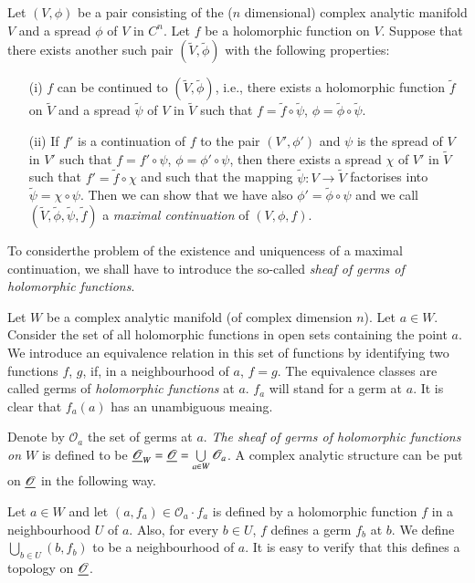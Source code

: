 \medskip
{}

Let $(V,\phi)$ be a pair consisting of the ($n$ dimensional) complex
analytic manifold $V$ and a spread $\phi$ of $V$ in $C^n$. Let $f$ be
a holomorphic function on $V$. Suppose that there exists another such
pair $(\tilde{V}, \tilde{\phi})$ with the following properties:
\begin{itemize}
\item[(i)] $f$ can be continued to $(\tilde{V}, \tilde{\phi})$, i.e.,
  there exists a holomorphic function $\tilde{f}$ on $\tilde{V}$ and a
  spread $\tilde{\psi}$ of $V$ in $\tilde{V}$ such that $f = \tilde{f}
  \circ \tilde{\psi}$, $\phi = \tilde{\phi} \circ \tilde{\psi}$.

\item[(ii)] If $f'$ is a continuation of $f$ to the pair $(V', \phi')$ and
  $\psi$ is the spread of $V$ in  $V'$ such that $f = f' \circ \psi$,
  $\phi = \phi' \circ \psi$, then there exists a spread $\chi$ of $V'$
  in $\tilde{V}$ such that $f' = \tilde{f} \circ \chi$ and such that
  the mapping $\tilde{\psi} : V \to \tilde{V}$ factorises into
  $\tilde{\psi} = \chi \circ \psi$. Then we can show that we have also
  $\phi' = \tilde{\phi} \circ \psi$ and we call $(\tilde{V},
  \tilde{\phi}, \tilde{\psi}, \tilde{f})$ a \textit{maximal
    continuation} of $(V, \phi, f)$.
\end{itemize}

To consider\pageoriginale the problem of the existence and uniquencess
of a maximal continuation, we shall have to introduce the so-called
\textit{sheaf of germs of holomorphic functions}.


Let $W$ be a complex analytic manifold (of complex dimension $n$). Let
$a \in W$. Consider the set of all holomorphic functions in open sets
containing the point $a$. We introduce an equivalence relation in this
set of functions by identifying two functions $f$, $g$, if, in a
neighbourhood of $a$, $f=g$. The equivalence classes are called germs
of \textit{holomorphic functions} at $a$. $f_a$ will stand for a germ
at $a$. It is clear that $f_a(a)$ has an unambiguous meaing.

Denote by $\mathscr{O}_a$ the set of germs at $a$. \textit{The sheaf
  of germs of holomorphic functions on $W$} is defined to be
$\underline{\mathscr{O}}_W = \underline{\mathscr{O}} = \bigcup\limits_{a \in W}
\mathscr{O}_a$. A complex analytic structure can be put on
$\underline{\mathscr{O}}$ in the following way. 

Let $a \in W$ and let $(a, f_a) \in\mathscr{O}_a \cdot f_a$ is defined
by a holomorphic function $f$ in a neighbourhood $U$ of $a$. Also, for
every $b \in U$, $f$ defines a germ $f_b$ at $b$. We define
$\bigcup\limits_{b \in U} (b, f_b)$ to be a neighbourhood of $a$. It
is easy to verify that this defines a topology on $\underline{\mathscr{O}}$.


